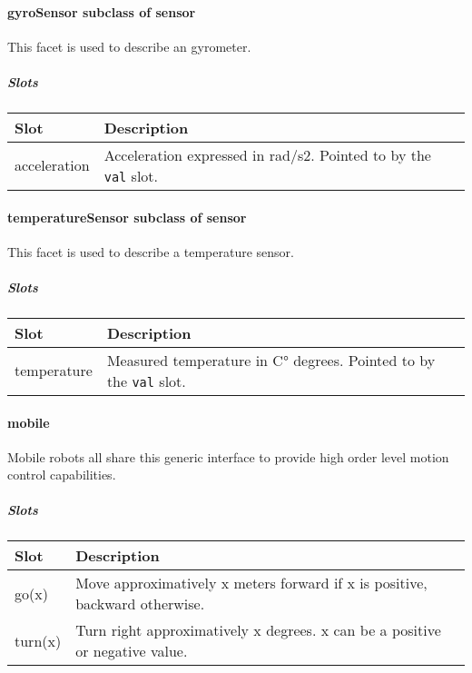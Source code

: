 \documentclass[a4paper]{article}
\begin{document}
\paragraph{gyroSensor  \textmd{subclass of sensor}}


This facet is used to describe an gyrometer.

\subparagraph{Slots}

\begin{flushleft}
\tablehead{}
\begin{supertabular}{|m{3.651cm}|m{11.639cm}|}
\hline
\sffamily\bfseries Slot &
\sffamily\bfseries Description\\\hline
acceleration &
\sffamily Acceleration expressed in rad/s2.
Pointed to by the \texttt{val} slot.\\\hline
\end{supertabular}
\end{flushleft}
\paragraph{ temperatureSensor  \textmd{subclass of sensor}}


This facet is used to describe a temperature sensor.

\subparagraph{Slots}

\begin{flushleft}
\tablehead{}
\begin{supertabular}{|m{2.98cm}|m{12.31cm}|}
\hline
\sffamily\bfseries Slot &
\sffamily\bfseries Description\\\hline
temperature &
\sffamily Measured temperature in C° degrees.
Pointed to by the \texttt{val} slot.\\\hline
\end{supertabular}
\end{flushleft}
\paragraph{mobile}


Mobile robots all share this generic interface to provide high order
level motion control capabilities.

\subparagraph{Slots}

\begin{flushleft}
\tablehead{}
\begin{supertabular}{|m{3.293cm}|m{11.997cm}|}
\hline
\sffamily\bfseries Slot &
\sffamily\bfseries Description\\\hline
go(x) &
\sffamily Move approximatively x meters forward
if x is positive, backward otherwise.\\\hline
turn(x) &
\sffamily Turn right approximatively x degrees.
x can be a positive or negative value.\\\hline
\end{supertabular}
\end{flushleft}
\end{document}
